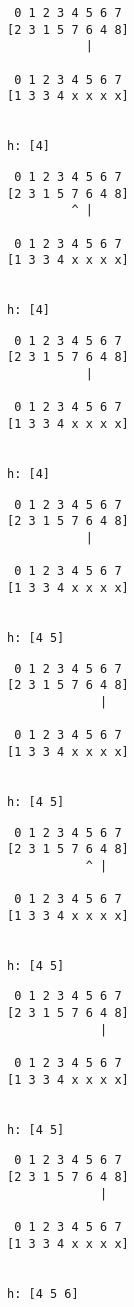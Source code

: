 { \begin{verbatim}
 0 1 2 3 4 5 6 7
[2 3 1 5 7 6 4 8]
           |

 0 1 2 3 4 5 6 7
[1 3 3 4 x x x x]


h: [4]
\end{verbatim} }

{ \begin{verbatim}
 0 1 2 3 4 5 6 7
[2 3 1 5 7 6 4 8]
         ^ |

 0 1 2 3 4 5 6 7
[1 3 3 4 x x x x]


h: [4]
\end{verbatim} }

{ \begin{verbatim}
 0 1 2 3 4 5 6 7
[2 3 1 5 7 6 4 8]
           |

 0 1 2 3 4 5 6 7
[1 3 3 4 x x x x]


h: [4]
\end{verbatim} }

{ \begin{verbatim}
 0 1 2 3 4 5 6 7
[2 3 1 5 7 6 4 8]
           |

 0 1 2 3 4 5 6 7
[1 3 3 4 x x x x]


h: [4 5]
\end{verbatim} }

{ \begin{verbatim}
 0 1 2 3 4 5 6 7
[2 3 1 5 7 6 4 8]
             |

 0 1 2 3 4 5 6 7
[1 3 3 4 x x x x]


h: [4 5]
\end{verbatim} }

{ \begin{verbatim}
 0 1 2 3 4 5 6 7
[2 3 1 5 7 6 4 8]
           ^ |

 0 1 2 3 4 5 6 7
[1 3 3 4 x x x x]


h: [4 5]
\end{verbatim} }

{ \begin{verbatim}
 0 1 2 3 4 5 6 7
[2 3 1 5 7 6 4 8]
             |

 0 1 2 3 4 5 6 7
[1 3 3 4 x x x x]


h: [4 5]
\end{verbatim} }

{ \begin{verbatim}
 0 1 2 3 4 5 6 7
[2 3 1 5 7 6 4 8]
             |

 0 1 2 3 4 5 6 7
[1 3 3 4 x x x x]


h: [4 5 6]
\end{verbatim} }

